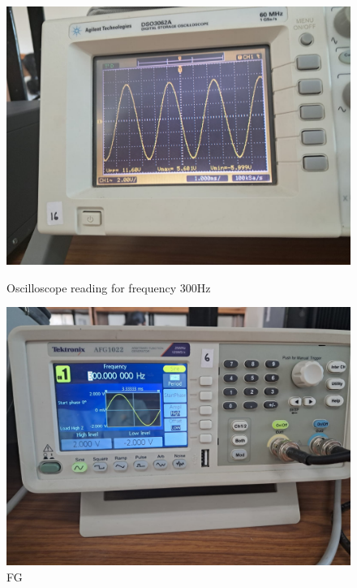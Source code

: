 \documentclass[a4paper,12pt]{article}
\begin{document}
\begin{figure}[H]
    \centering
    \begin{minipage}[b]{0.45\textwidth}
        \centering
        \includegraphics[width=\textwidth]{fig/lp/300o.jpeg}
        \caption{Oscilloscope reading for frequency 300Hz}
    \end{minipage}
    \hfill
    \begin{minipage}[b]{0.45\textwidth}
        \centering
        \includegraphics[width=\textwidth]{fig/lp/300.jpeg}
        \caption{FG}
    \end{minipage}
\end{figure}
\end{document}

